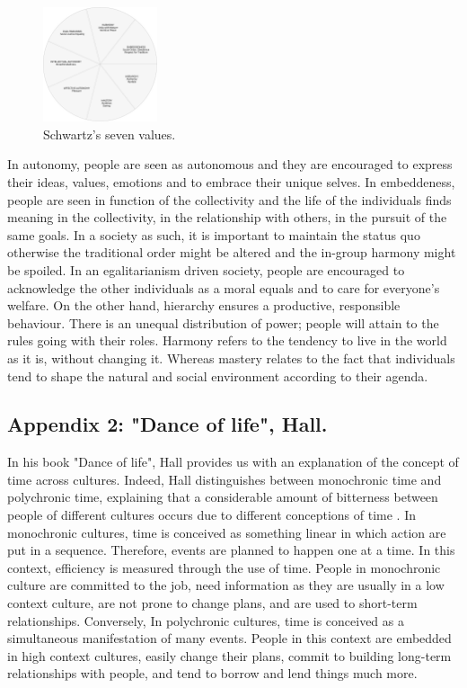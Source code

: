 \documentclass[../main.tex]{subfiles}
\begin{document}
\begin{figure}[h]
    \centering\includegraphics[width=0.3\textwidth]{images/socialvalues.pdf}
    \caption{Schwartz's seven values.}
\end{figure}

In autonomy, people are seen as autonomous and they are encouraged to express their ideas, values, emotions and to embrace their unique selves. In embeddeness, people are seen in function of the collectivity and the life of the individuals finds meaning in the collectivity, in the relationship with others, in the pursuit of the same goals. In a society as such, it is important to maintain the status quo otherwise the traditional order might be altered and the in-group harmony might be spoiled. In an egalitarianism driven society, people are encouraged to acknowledge the other individuals as a moral equals and to care for everyone's welfare. On the other hand, hierarchy ensures a productive, responsible behaviour. There is an unequal distribution of power; people will attain to the rules going with their roles. Harmony refers to the tendency to live in the world as it is, without changing it. Whereas mastery relates to the fact that individuals tend to shape the natural and social environment according to their agenda.


\subsection*{Appendix 2: "Dance of life", Hall.}

In his book "Dance of life", Hall provides us with an explanation of the concept of time across cultures. Indeed, Hall distinguishes between monochronic time and polychronic time, explaining that a considerable amount of bitterness between people of different cultures occurs due to different conceptions of time \autocite[179]{hall2}. In monochronic cultures, time is conceived as something linear in which action are put in a sequence. Therefore, events are planned to happen one at a time. In this context, efficiency is measured through the use of time. People in monochronic culture are committed to the job, need information as they are usually in a low context culture, are not prone to change plans, and are used to short-term relationships. Conversely, In polychronic cultures, time is conceived as a simultaneous manifestation of many events. People in this context are embedded in high context cultures, easily change their plans, commit to building long-term relationships with people, and tend to borrow and lend things much more.\\
\end{document}
